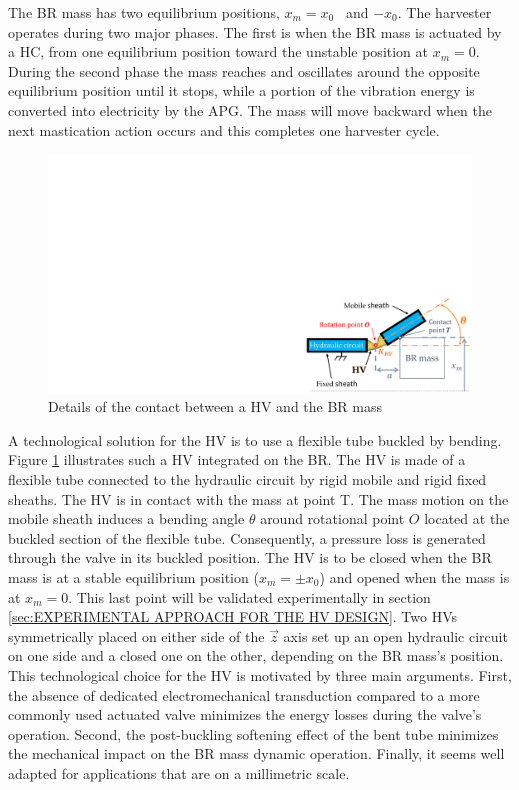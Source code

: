 \documentclass[3p,twocolumn,preprint]{elsarticle}
\begin{document}
The BR mass has two equilibrium positions, \mbox{$x_m = x_0$ } and \mbox{$-x_0$}. The harvester operates during two major phases. The first is when the BR mass is actuated by a HC, from one equilibrium position toward the unstable position at $x_m = 0$. During the second phase the mass reaches and oscillates around the opposite equilibrium position until it stops, while a portion of the vibration energy is converted into electricity by the APG. The mass will move backward when the next mastication action occurs and this completes one harvester cycle.
\begin{figure}[!htbp]
	\centering
	\captionsetup{justification=centering}
	\includegraphics[trim={20.5cm 0cm 0cm 11.5cm},clip, width=0.8\linewidth]{figures/HV_actuation_detail.pdf}
	\caption{Details of the contact between a HV and the BR mass} 
	\label{fig:HV_actuation_detail}
\end{figure}

A technological solution for the HV is to use a flexible tube buckled by bending. Figure \ref{fig:HV_actuation_detail} illustrates such a HV integrated on the BR. The HV is made of a flexible tube connected to the hydraulic circuit by rigid mobile and rigid fixed sheaths. The HV is in contact with the mass at point T. The mass motion on the mobile sheath induces a bending angle $\theta$ around rotational point $O$ located at the buckled section of the flexible tube. Consequently, a pressure loss is generated through the valve in its buckled position. The HV is to be closed when the BR mass is at a stable equilibrium position ($x_m=\pm x_0$) and opened when the mass is at $x_m=0$. This last point will be validated experimentally in section \ref{sec:EXPERIMENTAL APPROACH FOR THE HV DESIGN}. Two HVs symmetrically placed on either side of the $\vec{z}$ axis set up an open hydraulic circuit on one side and a closed one on the other, depending on the BR mass's position. This technological choice for the HV is motivated by three main arguments. First, the absence of dedicated electromechanical transduction compared to a more commonly used actuated valve minimizes the energy losses during the valve's operation. Second, the post-buckling softening effect of the bent tube minimizes the mechanical impact on the BR mass dynamic operation. Finally, it seems well adapted for applications that are on a  millimetric scale.
\end{document}
